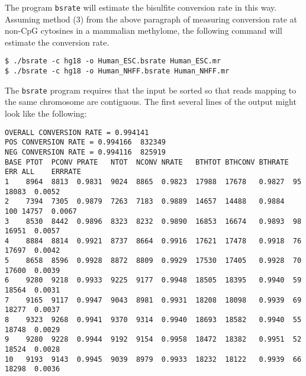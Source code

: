 \documentclass[10pt]{article}
\newcommand{\prog}[1]{\texttt{#1}}
\begin{document}
The program \prog{bsrate} will estimate the bisulfite conversion rate
in this way. Assuming method (3) from the above paragraph of measuring
conversion rate at non-CpG cytosines in a mammalian methylome, the
following command will estimate the conversion rate.
\begin{verbatim}
$ ./bsrate -c hg18 -o Human_ESC.bsrate Human_ESC.mr
$ ./bsrate -c hg18 -o Human_NHFF.bsrate Human_NHFF.mr
\end{verbatim}
The \prog{bsrate} program requires that the input be sorted so that
reads mapping to the same chromosome are contiguous. The first several
lines of the output might look like the following:
{\small{%
\begin{verbatim}
OVERALL CONVERSION RATE = 0.994141
POS CONVERSION RATE = 0.994166  832349
NEG CONVERSION RATE = 0.994116  825919
BASE PTOT  PCONV PRATE   NTOT  NCONV NRATE   BTHTOT BTHCONV BTHRATE ERR ALL    ERRRATE
1    8964  8813  0.9831  9024  8865  0.9823  17988  17678   0.9827  95  18083  0.0052
2    7394  7305  0.9879  7263  7183  0.9889  14657  14488   0.9884  100 14757  0.0067
3    8530  8442  0.9896  8323  8232  0.9890  16853  16674   0.9893  98  16951  0.0057
4    8884  8814  0.9921  8737  8664  0.9916  17621  17478   0.9918  76  17697  0.0042
5    8658  8596  0.9928  8872  8809  0.9929  17530  17405   0.9928  70  17600  0.0039
6    9280  9218  0.9933  9225  9177  0.9948  18505  18395   0.9940  59  18564  0.0031
7    9165  9117  0.9947  9043  8981  0.9931  18208  18098   0.9939  69  18277  0.0037
8    9323  9268  0.9941  9370  9314  0.9940  18693  18582   0.9940  55  18748  0.0029
9    9280  9228  0.9944  9192  9154  0.9958  18472  18382   0.9951  52  18524  0.0028
10   9193  9143  0.9945  9039  8979  0.9933  18232  18122   0.9939  66  18298  0.0036
\end{verbatim}%
}}
\end{document}
